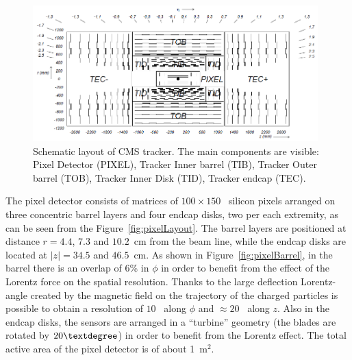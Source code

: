 \begin{figure}[hbt]
  \begin{center}
    \includegraphics[width=0.98\textwidth]{figDetector/stripLayout.png}
    \caption{Schematic layout of CMS tracker. The main components are visible:
             Pixel Detector (PIXEL), Tracker Inner barrel (TIB), Tracker Outer barrel
             (TOB), Tracker Inner Disk (TID), Tracker endcap (TEC).~\cite{Chatrchyan:2008aa}} 
    \label{fig:trackerLayout}
  \end{center}
\end{figure}

The pixel detector consists of matrices of $100\times150$~\si{\mum} silicon pixels
arranged on three concentric barrel layers and four endcap disks, two per
each extremity, as can be seen from the Figure~\ref{fig:pixelLayout}. 
The barrel layers are positioned at distance $r=4.4$, $7.3$ and $10.2$~\si{cm} 
from the beam line, while the endcap disks are located at $|z|=34.5$ and $46.5$~\si{cm}.
As shown in Figure~\ref{fig:pixelBarrel}, in the barrel there is an overlap of 6\%
in $\phi$ in order to benefit from the effect of the Lorentz force on the spatial resolution.
Thanks to the large deflection Lorentz-angle created by the magnetic field
on the trajectory of the charged particles is possible to obtain a resolution of $10$~\si{\mum} 
along $\phi$ and $\approx 20$~\si{\mum} along $z$. Also in the endcap disks, the sensors 
are arranged in a ``turbine'' geometry (the blades are rotated by $20\textdegree$) 
in order to benefit from the Lorentz effect. The total active area of the pixel detector is of about 1~\si{m}$^2$.


